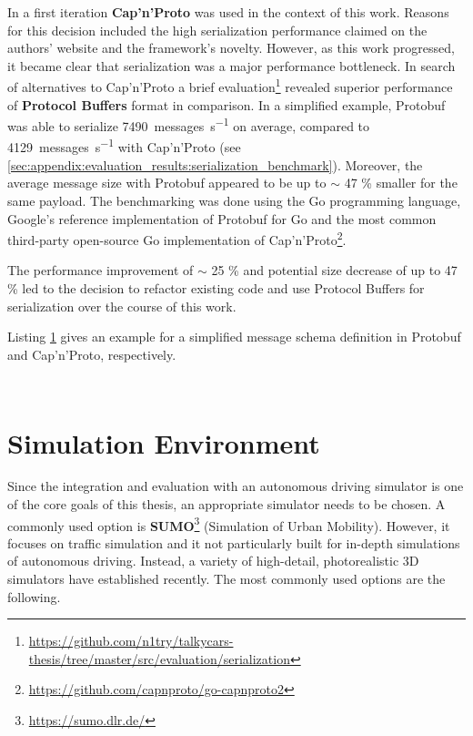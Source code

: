 In a first iteration \textbf{Cap'n'Proto} was used in the context of this work. Reasons for this decision included the high serialization performance claimed on the authors' website and the framework's novelty. However, as this work progressed, it became clear that serialization was a major performance bottleneck. In search of alternatives to Cap'n'Proto a brief evaluation\footnote{\url{https://github.com/n1try/talkycars-thesis/tree/master/src/evaluation/serialization}} revealed superior performance of \textbf{Protocol Buffers} format in comparison. In a simplified example, Protobuf was able to serialize \SI{7490}{messages\per\second} on average, compared to \SI{4129}{messages\per\second} with Cap'n'Proto (see \cref{sec:appendix:evaluation_results:serialization_benchmark}). Moreover, the average message size with Protobuf appeared to be up to $\sim$ 47 \% smaller for the same payload. The benchmarking was done using the Go programming language, Google's reference implementation of Protobuf for Go and the most common third-party open-source Go implementation of Cap'n'Proto\footnote{\url{https://github.com/capnproto/go-capnproto2}}. 

The performance improvement of $\sim$ 25 \% and potential size decrease of up to 47 \% led to the decision to refactor existing code and use Protocol Buffers for serialization over the course of this work.

Listing \ref{lst:serialization_schema_examples} gives an example for a simplified message schema definition in Protobuf and Cap'n'Proto, respectively.

\begin{figure}[!h]
	\begin{minipage}{0.5\textwidth}
		\centering
		\inputminted[fontsize=\footnotesize]{text}{97_listings/protobuf_snippet.proto}
	\end{minipage}
	\begin{minipage}{0.5\textwidth}
		\centering
		\inputminted[fontsize=\footnotesize]{text}{97_listings/capnp_snippet.capnp}
	\end{minipage}
	\label{lst:serialization_schema_examples}
\end{figure}

\section{Simulation Environment}
\label{sec:implementation:simulation_environment}
Since the integration and evaluation with an autonomous driving simulator is one of the core goals of this thesis, an appropriate simulator needs to be chosen. A commonly used option is \textbf{SUMO}\footnote{\url{https://sumo.dlr.de/}} (Simulation of Urban Mobility). However, it focuses on traffic simulation and it not particularly built for in-depth simulations of autonomous driving. Instead, a variety of high-detail, photorealistic 3D simulators have established recently. The most commonly used options are the following.

